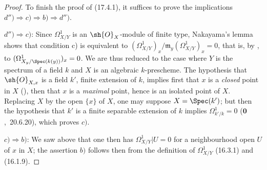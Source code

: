 \begin{proof}
To finish the proof of (17.4.1), it suffices to prove the implications $d'')\Rightarrow c)\Rightarrow b)\Rightarrow d'')$.

$d'')\Rightarrow c)$: Since $\Omega^1_{X/Y}$ is an $\sh{O}_X$-module of finite type, Nakayama's lemma shows that condition c) is equivalent to $(\Omega^1_{X/Y})_x/\mathfrak{m}_y(\Omega^1_{X/Y})_x=0$, that is, by , to $(\Omega^1_{X_y/\Spec(k(y))})_x=0$.
We are thus reduced to the case where $Y$ is the spectrum of a field $k$ and $X$ is an algebraic $k$-prescheme.
The hypothesis that $\sh{O}_{X,x}$ is a field $k'$, finite extension of $k$, implies first that $x$ is a \emph{closed} point in $X$ (), then that $x$ is a \emph{maximal} point, hence is an isolated point of $X$.
Replacing $X$ by the open $\{x\}$ of $X$, one may suppose $X=\Spec(k')$; but then the hypothesis that $k'$ is a finite separable extension of $k$ implies $\Omega^1_{k'/k}=0$ ($\mathbf{0}$,~20.6.20), which proves $c)$.

$c)\Rightarrow b)$: We saw above that one then has $\Omega^1_{X/Y}|U=0$ for a neighbourhood open $U$ of $x$ in $X$; the assertion $b)$ follows then from the definition of $\Omega^1_{X/Y}$ (16.3.1) and (16.1.9).


\end{proof}
